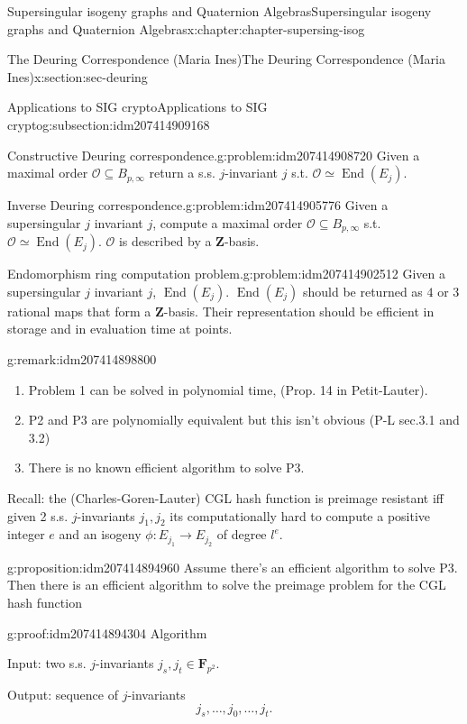 \documentclass[oneside,10pt,]{book}
\numberwithin{equation}{section}
\newcommand{\ZZ}{\mathbf{Z}}
\newcommand{\FF}{\mathbf{F}}
\newcommand{\ints}{\mathcal{O}}
\DeclareMathOperator{\End}{End}
\begin{document}
\begin{chapterptx}{Supersingular isogeny graphs and Quaternion Algebras}{}{Supersingular isogeny graphs and Quaternion Algebras}{}{}{x:chapter:chapter-supersing-isog}
\begin{sectionptx}{The Deuring Correspondence (Maria Ines)}{}{The Deuring Correspondence (Maria Ines)}{}{}{x:section:sec-deuring}
\begin{subsectionptx}{Applications to SIG crypto}{}{Applications to SIG crypto}{}{}{g:subsection:idm207414909168}
\begin{problem}{Constructive Deuring correspondence.}{g:problem:idm207414908720}
Given a maximal order \(\ints \subseteq B_{p,\infty}\) return a s.s. \(j\)-invariant \(j\) s.t. \(\ints \simeq \End(E_j)\).%
\end{problem}
\begin{problem}{Inverse Deuring correspondence.}{g:problem:idm207414905776}%
Given a supersingular \(j\) invariant \(j\), compute a maximal order \(\ints \subseteq B_{p,\infty}\)  s.t. \(\ints \simeq \End(E_j)\). \(\ints\) is described by a \(\ZZ\)-basis.%
\end{problem}
\begin{problem}{Endomorphism ring computation problem.}{g:problem:idm207414902512}%
Given a supersingular \(j\) invariant \(j\), \(\End(E_j)\). \(\End(E_j)\) should be returned as \(4\) or \(3\) rational maps that form a \(\ZZ\)-basis. Their representation should be efficient in storage and in evaluation time at points.%
\end{problem}
\begin{remark}{}{g:remark:idm207414898800}%
%
\begin{enumerate}
\item{}Problem 1 can be solved in polynomial time, (Prop. 14 in Petit-Lauter).%
\item{}P2 and P3 are polynomially equivalent but this isn't obvious (P-L sec.3.1 and 3.2)%
\item{}There is no known efficient algorithm to solve P3.%
\end{enumerate}
%
\end{remark}
Recall: the (Charles-Goren-Lauter) CGL hash function is preimage resistant iff given 2 s.s. \(j\)-invariants \(j_1,j_2\) its computationally hard to compute a  positive integer \(e\) and an isogeny \(\phi \colon E_{j_1} \to E_{j_2}\) of degree \(l^e\).%
\begin{proposition}{}{}{g:proposition:idm207414894960}%
Assume there's an efficient algorithm to solve P3. Then there is an efficient algorithm to solve the preimage problem for the CGL hash function%
\end{proposition}
\begin{proofptx}{}{g:proof:idm207414894304}
Algorithm%
\par
Input: two s.s. \(j\)-invariants \(j_s,j_t \in \FF_{p^2}\).%
\par
Output: sequence of \(j\)-invariants%
\begin{equation*}
j_s,\ldots,j_0,\ldots, j_t\text{.}
\end{equation*}
%
\par
%
\begin{enumerate}

\end{enumerate}
\end{proofptx}
\end{subsectionptx}
\end{sectionptx}
\end{chapterptx}
\end{document}
